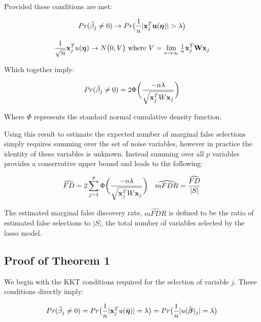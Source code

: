  Provided these conditions are met:

\begin{equation}
Pr(\hat{\beta}_j \neq 0)  \rightarrow Pr\big(\frac{1}{n}|\mathbf{x}_{j}^T \mathbf{u}(\boldsymbol{\eta})| > \lambda\big)
\end{equation}

\begin{equation}
\frac{1}{\sqrt{n}}\mathbf{x}_{j}^T u(\boldsymbol{\eta}) \rightarrow N\big(0, V\big) 
\text{   where } V = \lim_{n \to \infty} \tfrac{1}{n}\mathbf{x}_{j}^T \mathbf{W} \mathbf{x}_{j}
\end{equation}

Which together imply:

\begin{equation}
Pr(\hat{\beta}_j \neq 0)  = 2\Phi \bigg( \frac{-n\lambda}{\sqrt{ \mathbf{x}_j^TW\mathbf{x}_j}} \bigg)
\end{equation}

Where $\Phi$ represents the standard normal cumulative density function.


Using this result to estimate the expected number of marginal false selections simply requires summing over the set of noise variables, however in practice the identity of these variables is unknown. Instead summing over all $p$ variables provides a conservative upper bound and leads to the following:

\begin{align}
&\widehat{FD} = 2 \sum_{j=1}^{p} \Phi \bigg( \frac{-n\lambda}{\sqrt{\mathbf{x}_j^T W \mathbf{x}_j}} \bigg) & \widehat{mFDR} = \frac{\widehat{FD}}{|S|}
\end{align}

The estimated marginal false discovery rate, $\widehat{mFDR}$ is defined to be the ratio of estimated false selections to $|S|$, the total number of variables selected by the lasso model.

\subsection{Proof of Theorem 1}

We begin with the KKT conditions required for the selection of variable $j$.  These conditions directly imply:

\begin{equation*}
Pr(\hat{\beta}_j \neq 0)  = Pr\big(\frac{1}{n}|\mathbf{x}_{j}^T u(\hat{\boldsymbol{\eta}})| = \lambda\big)  = Pr\big(\frac{1}{n}|u(\hat{\boldsymbol{\beta}})_j| = \lambda\big)
\end{equation*}

